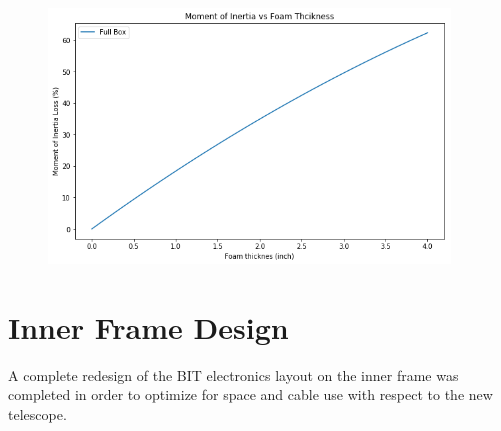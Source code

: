 \begin{figure}
    \begin{small}
        \begin{center}
            \includegraphics[width=0.95\textwidth]{Hardware/figs/battery_inertia_loss.png}
        \end{center}
        \caption{}
        \label{fig:}
    \end{small}
\end{figure}

\section{Inner Frame Design}
A complete redesign of the BIT electronics layout on the inner frame was completed in order to optimize for space and cable use with respect to the new telescope.


